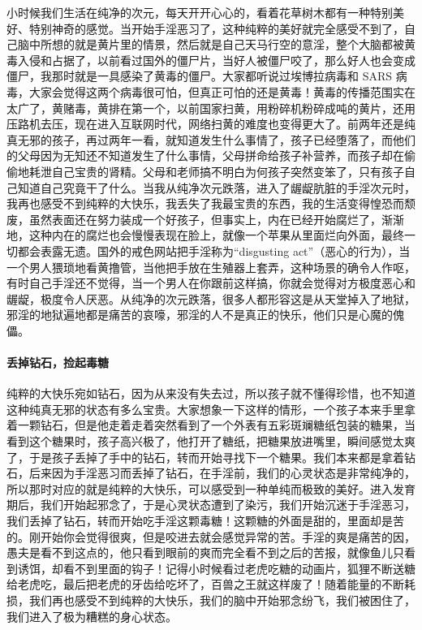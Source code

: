 小时候我们生活在纯净的次元，每天开开心心的，看着花草树木都有一种特别美好、特别神奇的感觉。当开始手淫恶习了，这种纯粹的美好就完全感受不到了，自己脑中所想的就是黄片里的情景，然后就是自己天马行空的意淫，整个大脑都被黄毒入侵和占据了，以前看过国外的僵尸片，当好人被僵尸咬了，那么好人也会变成僵尸，我那时就是一具感染了黄毒的僵尸。大家都听说过埃博拉病毒和 SARS 病毒，大家会觉得这两个病毒很可怕，但真正可怕的还是黄毒！黄毒的传播范围实在太广了，黄赌毒，黄排在第一个，以前国家扫黄，用粉碎机粉碎成吨的黄片，还用压路机去压，现在进入互联网时代，网络扫黄的难度也变得更大了。前两年还是纯真无邪的孩子，再过两年一看，就知道发生什么事情了，孩子已经堕落了，而他们的父母因为无知还不知道发生了什么事情，父母拼命给孩子补营养，而孩子却在偷偷地耗泄自己宝贵的肾精。父母和老师搞不明白为何孩子突然变笨了，只有孩子自己知道自己究竟干了什么。当我从纯净次元跌落，进入了龌龊肮脏的手淫次元时，我再也感受不到纯粹的大快乐，我丢失了我最宝贵的东西，我的生活变得惶恐而颓废，虽然表面还在努力装成一个好孩子，但事实上，内在已经开始腐烂了，渐渐地，这种内在的腐烂也会慢慢表现在脸上，就像一个苹果从里面烂向外面，最终一切都会表露无遗。国外的戒色网站把手淫称为“disgusting act”（恶心的行为），当一个男人猥琐地看黄撸管，当他把手放在生殖器上套弄，这种场景的确令人作呕，有时自己手淫还不觉得，当一个男人在你跟前这样搞，你就会觉得对方极度恶心和龌龊，极度令人厌恶。从纯净的次元跌落，很多人都形容这是从天堂掉入了地狱，邪淫的地狱遍地都是痛苦的哀嚎，邪淫的人不是真正的快乐，他们只是心魔的傀儡。

\paragraph{丢掉钻石，捡起毒糖}

纯粹的大快乐宛如钻石，因为从来没有失去过，所以孩子就不懂得珍惜，也不知道这种纯真无邪的状态有多么宝贵。大家想象一下这样的情形，一个孩子本来手里拿着一颗钻石，但是他走着走着突然看到了一个外表有五彩斑斓糖纸包装的糖果，当看到这个糖果时，孩子高兴极了，他打开了糖纸，把糖果放进嘴里，瞬间感觉太爽了，于是孩子丢掉了手中的钻石，转而开始寻找下一个糖果。我们本来都是拿着钻石，后来因为手淫恶习而丢掉了钻石，在手淫前，我们的心灵状态是非常纯净的，所以那时对应的就是纯粹的大快乐，可以感受到一种单纯而极致的美好。进入发育期后，我们开始起邪念了，于是心灵状态遭到了染污，我们开始沉迷于手淫恶习，我们丢掉了钻石，转而开始吃手淫这颗毒糖！这颗糖的外面是甜的，里面却是苦的。刚开始你会觉得很爽，但是咬进去就会感觉异常的苦。手淫的爽是痛苦的因，愚夫是看不到这点的，他只看到眼前的爽而完全看不到之后的苦报，就像鱼儿只看到诱饵，却看不到里面的钩子！记得小时候看过老虎吃糖的动画片，狐狸不断送糖给老虎吃，最后把老虎的牙齿给吃坏了，百兽之王就这样废了！随着能量的不断耗损，我们再也感受不到纯粹的大快乐，我们的脑中开始邪念纷飞，我们被困住了，我们进入了极为糟糕的身心状态。


